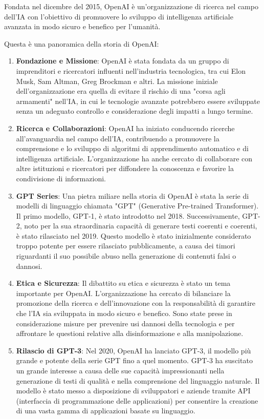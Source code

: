 Fondata nel dicembre del 2015, OpenAI è un'organizzazione di ricerca nel campo dell'IA con l'obiettivo di promuovere lo sviluppo di intelligenza artificiale avanzata in modo sicuro e benefico per l'umanità.

Questa è una panoramica della storia di OpenAI:

\begin{enumerate}
    \item \textbf{Fondazione e Missione}: OpenAI è stata fondata da un gruppo di imprenditori e ricercatori influenti nell'industria tecnologica, tra cui Elon Musk, Sam Altman, Greg Brockman e altri. La missione iniziale dell'organizzazione era quella di evitare il rischio di una "corsa agli armamenti" nell'IA, in cui le tecnologie avanzate potrebbero essere sviluppate senza un adeguato controllo e considerazione degli impatti a lungo termine.
    \item \textbf{Ricerca e Collaborazioni}: OpenAI ha iniziato conducendo ricerche all'avanguardia nel campo dell'IA, contribuendo a promuovere la comprensione e lo sviluppo di algoritmi di apprendimento automatico e di intelligenza artificiale. L'organizzazione ha anche cercato di collaborare con altre istituzioni e ricercatori per diffondere la conoscenza e favorire la condivisione di informazioni.
    \item \textbf{GPT Series}: Una pietra miliare nella storia di OpenAI è stata la serie di modelli di linguaggio chiamata "GPT" (Generative Pre-trained Transformer). Il primo modello, GPT-1, è stato introdotto nel 2018. Successivamente, GPT-2, noto per la sua straordinaria capacità di generare testi coerenti e coerenti, è stato rilasciato nel 2019. Questo modello è stato inizialmente considerato troppo potente per essere rilasciato pubblicamente, a causa dei timori riguardanti il suo possibile abuso nella generazione di contenuti falsi o dannosi.
    \item \textbf{Etica e Sicurezza}: Il dibattito su etica e sicurezza è stato un tema importante per OpenAI. L'organizzazione ha cercato di bilanciare la promozione della ricerca e dell'innovazione con la responsabilità di garantire che l'IA sia sviluppata in modo sicuro e benefico. Sono state prese in considerazione misure per prevenire usi dannosi della tecnologia e per affrontare le questioni relative alla disinformazione e alla manipolazione.
    \item \textbf{Rilascio di GPT-3}: Nel 2020, OpenAI ha lanciato GPT-3, il modello più grande e potente della serie GPT fino a quel momento. GPT-3 ha suscitato un grande interesse a causa delle sue capacità impressionanti nella generazione di testi di qualità e nella comprensione del linguaggio naturale. Il modello è stato messo a disposizione di sviluppatori e aziende tramite API (interfaccia di programmazione delle applicazioni) per consentire la creazione di una vasta gamma di applicazioni basate su linguaggio.

\end{enumerate}
